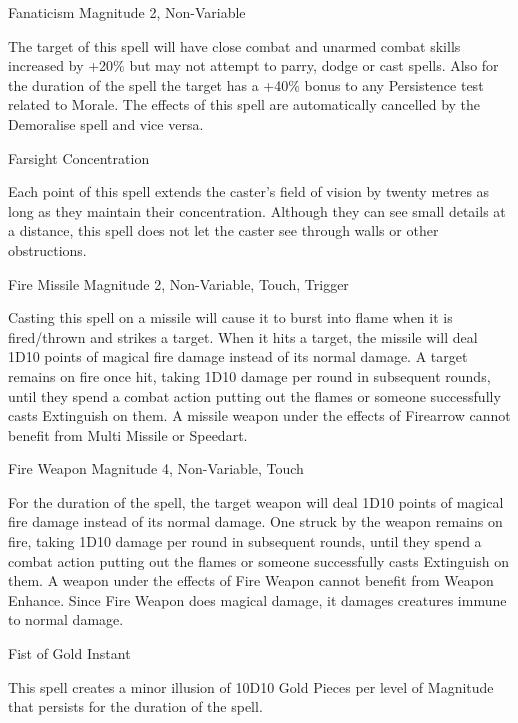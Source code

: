 \begin{rpg-spell}
{Fanaticism}
{Magnitude 2, Non-Variable}

The target of this spell will have close combat and unarmed combat skills increased by +20\% but may not attempt to parry, dodge or cast spells. Also for the duration of the spell the target has a +40\% bonus to any Persistence test related to Morale. The effects of this spell are automatically cancelled by the Demoralise spell and vice versa.
\end{rpg-spell}


\begin{rpg-spell}
{Farsight}
{Concentration}

Each point of this spell extends the caster’s field of vision by twenty metres as long as they maintain their concentration. Although they can see small details at a distance, this spell does not let the caster see through walls or other obstructions.
\end{rpg-spell}


\begin{rpg-spell}
{Fire Missile}
{Magnitude 2, Non-Variable, Touch, Trigger}

Casting this spell on a missile will cause it to burst into flame when it is fired/thrown and strikes a target. When it hits a target, the missile will deal 1D10 points of magical fire damage instead of its normal damage. A target remains on fire once hit, taking 1D10 damage per round in subsequent rounds, until they spend a combat action putting out the flames or someone successfully casts Extinguish on them. A missile weapon under the effects of Firearrow cannot benefit from Multi Missile or Speedart. 
\end{rpg-spell}


\begin{rpg-spell}
{Fire Weapon}
{Magnitude 4, Non-Variable, Touch}

For the duration of the spell, the target weapon will deal 1D10 points of magical fire damage instead of its normal damage. One struck by the weapon remains on fire, taking 1D10 damage per round in subsequent rounds, until they spend a combat action putting out the flames or someone successfully casts Extinguish on them. A weapon under the effects of Fire Weapon cannot benefit from Weapon Enhance. Since Fire Weapon does magical damage, it damages creatures immune to normal damage.
\end{rpg-spell}


\begin{rpg-spell}
{Fist of Gold}
{Instant}

This spell creates a minor illusion of 10D10 Gold Pieces per level of Magnitude that persists for the duration of the spell.
\end{rpg-spell}


